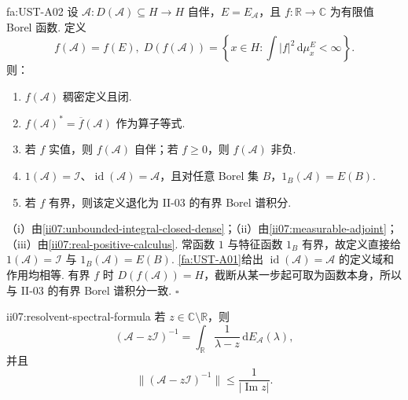 \begin{FATheorem}[A][无界自伴可测函数演算]{fa:UST-A02}
设 \(\displaystyle\mathcal A:D(\mathcal A)\subseteq H\to H\) 自伴，\(\displaystyle E=E_{\mathcal A}\)，且 \(\displaystyle f:\mathbb R\to\mathbb C\) 为有限值 Borel 函数. 定义
\[
f(\mathcal A)=f(E),
\;
D(f(\mathcal A))
=
\left\{
 x\in H:
 \int|f|^2\,\mathrm{d}\mu_x^E<\infty
\right\}.
\]
则：
\begin{enumerate}[label=\textnormal{(\roman*)}]
\item \(\displaystyle f(\mathcal A)\) 稠密定义且闭.
\item \(\displaystyle f(\mathcal A)^*=\overline f(\mathcal A)\) 作为算子等式.
\item 若 \(\displaystyle f\) 实值，则 \(\displaystyle f(\mathcal A)\) 自伴；若 \(\displaystyle f\geqslant0\)，则 \(\displaystyle f(\mathcal A)\) 非负.
\item \(\displaystyle1(\mathcal A)=\mathcal I\)、\(\displaystyle\operatorname{id}(\mathcal A)=\mathcal A\)，且对任意 Borel 集 \(\displaystyle B\)，\(\displaystyle1_B(\mathcal A)=E(B)\).
\item 若 \(\displaystyle f\) 有界，则该定义退化为 II-03 的有界 Borel 谱积分.
\end{enumerate}
\end{FATheorem}

\begin{FAProof}
（i）由\autoref{ii07:unbounded-integral-closed-dense}；（ii）由\autoref{ii07:measurable-adjoint}；（iii）由\autoref{ii07:real-positive-calculus}. 常函数 \(\displaystyle1\) 与特征函数 \(\displaystyle1_B\) 有界，故定义直接给 \(\displaystyle1(\mathcal A)=\mathcal I\) 与 \(\displaystyle1_B(\mathcal A)=E(B)\). \autoref{fa:UST-A01}给出 \(\displaystyle\operatorname{id}(\mathcal A)=\mathcal A\) 的定义域和作用均相等. 有界 \(\displaystyle f\) 时 \(\displaystyle D(f(\mathcal A))=H\)，截断从某一步起可取为函数本身，所以与 II-03 的有界 Borel 谱积分一致.
\hfill\(\square\)
\end{FAProof}

\begin{FAProposition}[B][自伴预解的谱积分公式]{ii07:resolvent-spectral-formula}
若 \(\displaystyle z\in\mathbb C\setminus\mathbb R\)，则
\[
(\mathcal A-z\mathcal I)^{-1}
=
\int_{\mathbb R}\frac1{\lambda-z}\,\mathrm{d}E_{\mathcal A}(\lambda),
\]
并且
\[
\|(\mathcal A-z\mathcal I)^{-1}\|
\leqslant
\frac1{|\operatorname{Im}z|}.
\]
\end{FAProposition}

